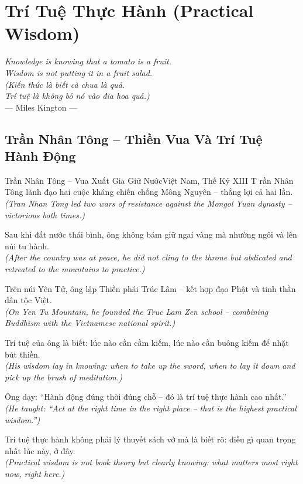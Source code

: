 \chapter{Trí Tuệ Thực Hành (Practical Wisdom)}
\begin{center}
  \textit{\color{truyenblue}Knowledge is knowing that a tomato is a fruit.\\
  Wisdom is not putting it in a fruit salad.}\\
  \textit{(Kiến thức là biết cà chua là quả.\\
  Trí tuệ là không bỏ nó vào đĩa hoa quả.)}\\[4pt]
  \small\color{truyengold}--- Miles Kington ---
\end{center}
\ngancach

\section{Trần Nhân Tông -- Thiền Vua Và Trí Tuệ Hành Động}
\begin{truyen}{Trần Nhân Tông -- Vua Xuất Gia Giữ Nước}{Việt Nam, Thế Kỷ XIII}
T rần Nhân Tông lãnh đạo hai cuộc kháng chiến chống Mông Nguyên -- thắng lợi cả hai lần.\\
\textit{(Tran Nhan Tong led two wars of resistance against the Mongol Yuan dynasty -- victorious both times.)}

Sau khi đất nước thái bình, ông không bám giữ ngai vàng mà nhường ngôi và lên núi tu hành.\\
\textit{(After the country was at peace, he did not cling to the throne but abdicated and retreated to the mountains to practice.)}

Trên núi Yên Tử, ông lập Thiền phái Trúc Lâm -- kết hợp đạo Phật và tinh thần dân tộc Việt.\\
\textit{(On Yen Tu Mountain, he founded the Truc Lam Zen school -- combining Buddhism with the Vietnamese national spirit.)}

Trí tuệ của ông là biết: lúc nào cần cầm kiếm, lúc nào cần buông kiếm để nhặt bút thiền.\\
\textit{(His wisdom lay in knowing: when to take up the sword, when to lay it down and pick up the brush of meditation.)}

Ông dạy: ``Hành động đúng thời đúng chỗ -- đó là trí tuệ thực hành cao nhất.''\\
\textit{(He taught: ``Act at the right time in the right place -- that is the highest practical wisdom.'')}

\end{truyen}
\begin{baihoc}
  Trí tuệ thực hành không phải lý thuyết sách vở mà là biết rõ: điều gì quan trọng nhất lúc này, ở đây.\\
  \textit{(Practical wisdom is not book theory but clearly knowing: what matters most right now, right here.)}
\end{baihoc}

